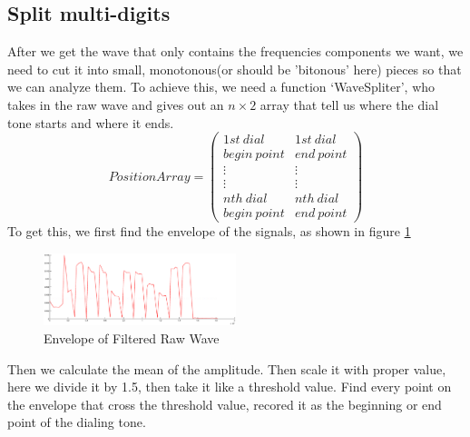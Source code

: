 \documentclass[journal]{./sty/IEEEtran}
\let\MYoriglatexcaption\caption
\renewcommand{\caption}[2][\relax]{\MYoriglatexcaption[#2]{#2}}
\begin{document}
\subsection{Split multi-digits}
	After we get the wave that only contains the frequencies components we want, we need to cut it into small, monotonous(or should be 'bitonous' here) pieces so that we can analyze them. To achieve this, we need a function `WaveSpliter', who takes in the raw wave and gives out an $n \times 2$ array that tell us where the dial tone starts and where it ends.\\
	\[
	PositionArray=
		\left(\begin{array}{cc}1st\ dial & 1st\ dial \\begin\ point & end\ point \\\vdots & \vdots \\\vdots & \vdots \\nth\ dial & nth\ dial \\begin\ point & end\ point\end{array}\right)
	\]
	To get this, we first find the envelope of the signals, as shown in figure \ref{fig:fwe}
\begin{figure}[!t]
\centering
\includegraphics[width=0.5\textwidth]{./pic/FiltedWave_Env.eps}
\caption{Envelope of Filtered Raw Wave}\label{fig:fwe}
\end{figure}
Then we calculate the mean of the amplitude. Then scale it with proper value, here we divide it by 1.5, then take it like a threshold value. Find every point on the envelope that cross the threshold value, recored it as the beginning or end point of the dialing tone. 
\end{document}
